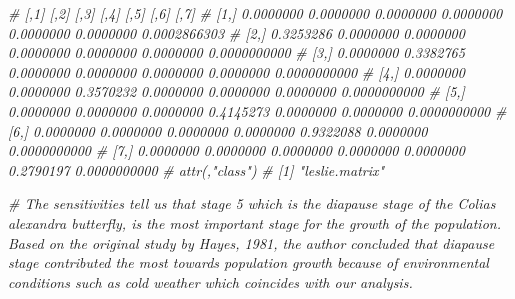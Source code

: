 \documentclass[]{article}
\newenvironment{Shaded}{\begin{snugshade}}{\end{snugshade}}
\newcommand{\CommentTok}[1]{\textcolor[rgb]{0.56,0.35,0.01}{\textit{#1}}}
\begin{document}
\begin{Shaded}
\begin{Highlighting}[]
\CommentTok{#           [,1]      [,2]      [,3]      [,4]      [,5]      [,6]         [,7]}
\CommentTok{# [1,] 0.0000000 0.0000000 0.0000000 0.0000000 0.0000000 0.0000000 0.0002866303}
\CommentTok{# [2,] 0.3253286 0.0000000 0.0000000 0.0000000 0.0000000 0.0000000 0.0000000000}
\CommentTok{# [3,] 0.0000000 0.3382765 0.0000000 0.0000000 0.0000000 0.0000000 0.0000000000}
\CommentTok{# [4,] 0.0000000 0.0000000 0.3570232 0.0000000 0.0000000 0.0000000 0.0000000000}
\CommentTok{# [5,] 0.0000000 0.0000000 0.0000000 0.4145273 0.0000000 0.0000000 0.0000000000}
\CommentTok{# [6,] 0.0000000 0.0000000 0.0000000 0.0000000 0.9322088 0.0000000 0.0000000000}
\CommentTok{# [7,] 0.0000000 0.0000000 0.0000000 0.0000000 0.0000000 0.2790197 0.0000000000}
\CommentTok{# attr(,"class")}
\CommentTok{# [1] "leslie.matrix"}

\CommentTok{#  The sensitivities tell us that stage 5 which is the diapause stage of the Colias alexandra butterfly, is the most important stage for the growth of the population. Based on the original study by Hayes, 1981, the author concluded that diapause stage contributed the most towards population growth because of environmental conditions such as cold weather which coincides with our analysis.}
\end{Highlighting}
\end{Shaded}
\end{document}
